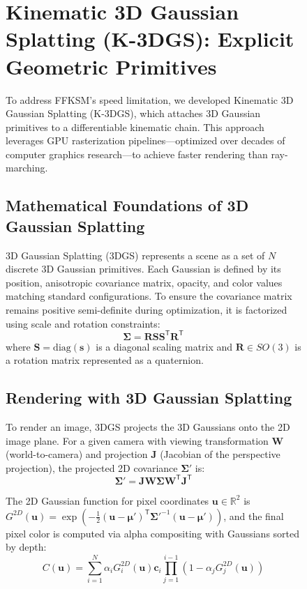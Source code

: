 \documentclass[12pt,a4paper,oneside]{report}
\begin{document}
\begin{figure}[H]
\section{Kinematic 3D Gaussian Splatting (K-3DGS): Explicit Geometric Primitives}

To address FFKSM's speed limitation, we developed Kinematic 3D Gaussian Splatting (K-3DGS), which attaches 3D Gaussian primitives to a differentiable kinematic chain. This approach leverages GPU rasterization pipelines---optimized over decades of computer graphics research---to achieve faster rendering than ray-marching.

\subsection{Mathematical Foundations of 3D Gaussian Splatting}

3D Gaussian Splatting (3DGS) represents a scene as a set of $N$ discrete 3D Gaussian primitives. Each Gaussian is defined by its position, anisotropic covariance matrix, opacity, and color values matching standard configurations. To ensure the covariance matrix remains positive semi-definite during optimization, it is factorized using scale and rotation constraints:
\begin{equation}
\boldsymbol{\Sigma} = \mathbf{R} \mathbf{S} \mathbf{S}^\mathsf{T} \mathbf{R}^\mathsf{T}
\end{equation}
where $\mathbf{S} = \text{diag}(\mathbf{s})$ is a diagonal scaling matrix and $\mathbf{R} \in SO(3)$ is a rotation matrix represented as a quaternion.

\subsection{Rendering with 3D Gaussian Splatting}

To render an image, 3DGS projects the 3D Gaussians onto the 2D image plane. For a given camera with viewing transformation $\mathbf{W}$ (world-to-camera) and projection $\mathbf{J}$ (Jacobian of the perspective projection), the projected 2D covariance $\boldsymbol{\Sigma}'$ is:
\begin{equation}
\boldsymbol{\Sigma}' = \mathbf{J} \mathbf{W} \boldsymbol{\Sigma} \mathbf{W}^\mathsf{T} \mathbf{J}^\mathsf{T}
\end{equation}

The 2D Gaussian function for pixel coordinates $\mathbf{u} \in \mathbb{R}^2$ is $G^{2D}(\mathbf{u}) = \exp\left(-\frac{1}{2} (\mathbf{u} - \boldsymbol{\mu}')^\mathsf{T} \boldsymbol{\Sigma}'^{-1} (\mathbf{u} - \boldsymbol{\mu}')\right)$, and the final pixel color is computed via alpha compositing with Gaussians sorted by depth:
\begin{equation}
C(\mathbf{u}) = \sum_{i=1}^{N} \alpha_i G_i^{2D}(\mathbf{u}) \mathbf{c}_i \prod_{j=1}^{i-1} (1 - \alpha_j G_j^{2D}(\mathbf{u}))
\end{equation}


\end{figure}
\end{document}
